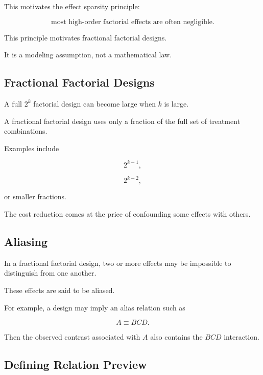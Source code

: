 This motivates the effect sparsity principle:

\[
\boxed{
\text{most high-order factorial effects are often negligible}.
}
\]

This principle motivates fractional factorial designs.

It is a modeling assumption, not a mathematical law.

\subsection{Fractional Factorial Designs}
\label{subsec:fractional-factorial-designs}

A full \(2^k\) factorial design can become large when \(k\) is large.

A fractional factorial design uses only a fraction of the full set of
treatment combinations.

Examples include

\[
\boxed{
2^{k-1},
}
\]

\[
\boxed{
2^{k-2},
}
\]

or smaller fractions.

The cost reduction comes at the price of confounding some effects with
others.

\subsection{Aliasing}
\label{subsec:factorial-aliasing}

In a fractional factorial design, two or more effects may be impossible
to distinguish from one another.

These effects are said to be aliased.

For example, a design may imply an alias relation such as

\[
\boxed{
A
\equiv
BCD.
}
\]

Then the observed contrast associated with \(A\) also contains the
\(BCD\) interaction.

\subsection{Defining Relation Preview}
\label{subsec:defining-relation-preview}

